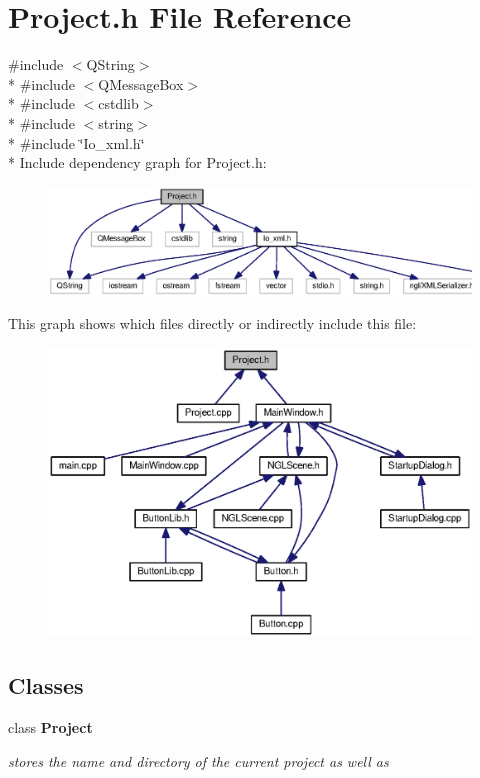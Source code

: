 \section{Project.\-h File Reference}
\label{_project_8h}
{\ttfamily \#include $<$Q\-String$>$}\\*
{\ttfamily \#include $<$Q\-Message\-Box$>$}\\*
{\ttfamily \#include $<$cstdlib$>$}\\*
{\ttfamily \#include $<$string$>$}\\*
{\ttfamily \#include \char`\"{}Io\-\_\-xml.\-h\char`\"{}}\\*
Include dependency graph for Project.\-h\-:\nopagebreak
\begin{figure}[H]
\begin{center}
\leavevmode
\includegraphics[width=350pt]{_project_8h__incl}
\end{center}
\end{figure}
This graph shows which files directly or indirectly include this file\-:
\nopagebreak
\begin{figure}[H]
\begin{center}
\leavevmode
\includegraphics[width=350pt]{_project_8h__dep__incl}
\end{center}
\end{figure}
\subsection*{Classes}
\begin{DoxyCompactItemize}
\item 
class {\bf Project}
\begin{DoxyCompactList}\small\item\em stores the name and directory of the current project as well as \end{DoxyCompactList}\end{DoxyCompactItemize}
